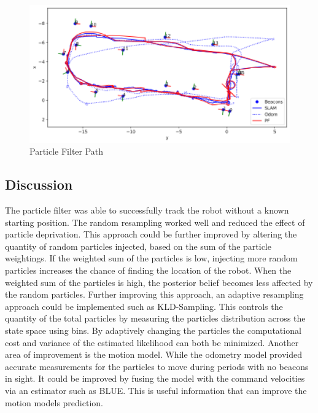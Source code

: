 \documentclass[a4paper,12pt]{article}
\begin{document}
\begin{figure}[h]
\includegraphics[width=13cm]{PfPath}
\centering
\caption{Particle Filter Path}
\end{figure}

\subsection{Discussion}
The particle filter was able to successfully track the robot without a known starting position. The random resampling worked well and reduced the effect of particle deprivation. This approach could be further improved by altering the quantity of random particles injected, based on the sum of the particle weightings. If the weighted sum of the particles is low, injecting more random particles increases the chance of finding the location of the robot. When the weighted sum of the particles is high, the posterior belief becomes less affected by the random particles. Further improving this approach, an adaptive resampling approach could be implemented such as KLD-Sampling. This controls the quantity of the total particles by measuring the particles distribution across the state space using bins. By adaptively changing the particles the computational cost and variance of the estimated likelihood can both be minimized. Another area of improvement is the motion model. While the odometry model provided accurate measurements for the particles to move during periods with no beacons in sight. It could be improved by fusing the model with the command velocities via an estimator such as BLUE. This is useful information that can improve the motion models prediction.  
\end{document}
